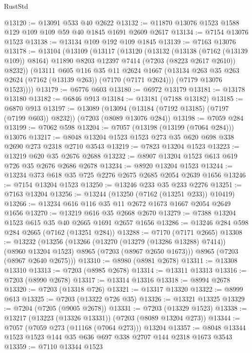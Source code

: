 \begin{lexlean}{RustStd}
\begin{coremodule}
@13120 := @13091 @533 @40 @2622
@13132 := @11870 @13076 @1523 @1588 @129 @109 @109 @59 @40 @1845 @1691 @2609 @2617
@13134 := @7154 @13076 @1523
@13138 := @13134 @109 @192 @109 @1845
@13139 := @7163 @13076
@13178 := @13104
    (@13109
      (@13117
        (@13120
          (@13132
            (@13138 (@7162 (@13139 @109)) @8164)
            @11890
            @8203
            @12397
            @7414
            (@7203 (@8223 @2617 @2610))
            @8232))
        (@13111
          @605
          @116
          @35
          @11
          @2624
          @1667
          (@13134 @263 @35 @263 @2624 (@7162 (@13139 @263)) (@7170 (@7171 @2624)))
          (@7179 @13076 @1523))))
@13179 := @6776 @603
@13180 := @6972 @13179
@13181 := @13178 @13180
@13182 := @6846 @913
@13184 := @13181 (@7188 @13182)
@13185 := @6870 @913
@13197 := @13089
    (@13094 (@13184 (@7192 @13185) (@7197 (@7199 @603)) @8232))
    (@7203 (@8089 @13076 @284))
@13198 := @7059 @284
@13199 := @7062 @598
@13204 := @7057 (@13198 (@13199 (@7064 @284))) @13076
@13217 := @8048 @13204 @1523 @1523 @273 @35 @620 @698 @338 @2690 @273 @2318 @2710 @3543
@13219 := @7823 @13204 @1523
@13223 := @13219 @620 @35 @2676 @2688
@13232 := @8907 @13204 @1523 @613 @619 @726 @35 @2676 @2686 @2678
@13234 := @8920 @13204 @1523
@13244 := @13234 @373 @618 @35 @725 @2276 @2675 @2685 @2054 @2639 @1656
@13246 := @7154 @13204 @1523
@13250 := @13246 @233 @35 @233 @2276
@13251 := @7163 @13204
@13256 := @13244 (@13250 (@7162 (@13251 @233)) @10419)
@13266 := @13234 @616 @116 @35 @11 @2672 @1673 @1667 @2054 @2649 @1656
@13270 := @13219 @616 @35 @2668 @2670
@13279 := @7388 @13204 @1523 @615 @35 @40 @2665 @1691 @2657 @1656
@13286 := @13246 @284 @598 @284 @2665 (@7162 (@13251 @284))
@13288 := @7170 (@7171 @2665)
@13308 := @13232
    (@13256
      (@13266
        (@13270 (@13279 (@13286 @13288) @7414))
        (@8960 @13204 @1523)
        @8965
        (@7203 (@8967 @2650 @1673)))
      @8965
      (@7203 (@8967 @2640 @2675)))
@13310 := @8980 (@8981 @2678)
@13311 := @13308 @13310
@13313 := @7203 (@8985 @2678)
@13314 := @13311 @13313
@13316 := @7203 (@8990 @2678)
@13317 := @13314 @13316
@13318 := @8994 @2678
@13320 := @7203 (@13318 @726)
@13321 := @13317 @13320
@13322 := @8999 @613
@13325 := @7203 (@13322 @726 @35)
@13326 := @13321 @13325
@13329 := @7204 (@7205 (@9005 @2678))
@13331 := @7203 (@13329 @1523)
@13338 := @13217 (@13223 (@13326 @13331)) (@7203 (@8089 @13204 @273))
@13344 := @7057 (@7059 @273 (@11168 (@7064 @273))) @13204
@13357 := @8048 @13344 @1523 @1523 @144 @35 @636 @697 @338 @2707 @144 @2318 @1673 @3543
@13359 := @7110 @13344 @1523

\end{coremodule}
\end{lexlean}
